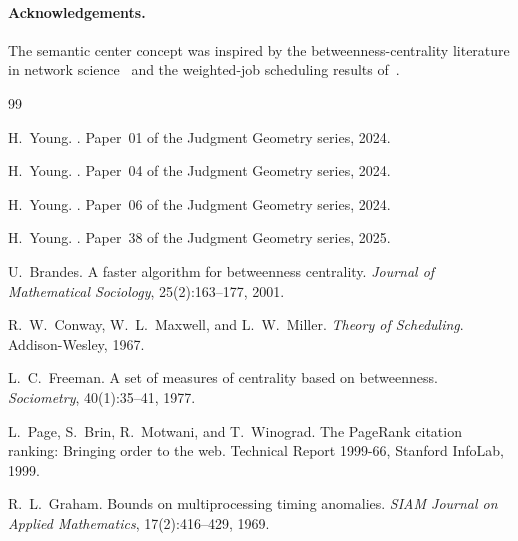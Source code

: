 \documentclass[11pt]{article}
\begin{document}
\paragraph{Acknowledgements.}
The semantic center concept was inspired by the betweenness-centrality
literature in network science~\cite{Freeman1977} and the weighted-job
scheduling results of~\cite{Conway1967}.

\begin{thebibliography}{99}

H.~Young.
.
\newblock Paper~01 of the Judgment Geometry series, 2024.

H.~Young.
.
\newblock Paper~04 of the Judgment Geometry series, 2024.

H.~Young.
.
\newblock Paper~06 of the Judgment Geometry series, 2024.

H.~Young.
.
\newblock Paper~38 of the Judgment Geometry series, 2025.

U.~Brandes.
\newblock A faster algorithm for betweenness centrality.
\newblock \emph{Journal of Mathematical Sociology}, 25(2):163--177, 2001.

R.~W.~Conway, W.~L.~Maxwell, and L.~W.~Miller.
\newblock \emph{Theory of Scheduling}.
\newblock Addison-Wesley, 1967.

L.~C.~Freeman.
\newblock A set of measures of centrality based on betweenness.
\newblock \emph{Sociometry}, 40(1):35--41, 1977.

L.~Page, S.~Brin, R.~Motwani, and T.~Winograd.
\newblock The {PageRank} citation ranking: Bringing order to the web.
\newblock Technical Report 1999-66, Stanford InfoLab, 1999.

R.~L.~Graham.
\newblock Bounds on multiprocessing timing anomalies.
\newblock \emph{SIAM Journal on Applied Mathematics}, 17(2):416--429, 1969.

\end{thebibliography}
\end{document}
